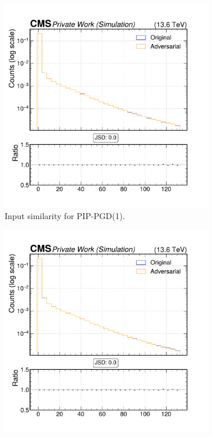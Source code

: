 \begin{figure}[htbp]
  \centering
  \begin{subfigure}[t]{0.32\textwidth}
    \includegraphics[width=\linewidth]{media/output/features/compare/combined_it_1/cmp_cpf_arr_Cpfcan_BtagPf_trackSip2dSig.pdf}
    \caption*{Input similarity for PIP-PGD(1).}
  \end{subfigure}\hfill
  \begin{subfigure}[t]{0.32\textwidth}
    \includegraphics[width=\linewidth]{media/output/features/compare/combined_it_2/cmp_cpf_arr_Cpfcan_BtagPf_trackSip2dSig.pdf}

\end{subfigure}
\end{figure}

